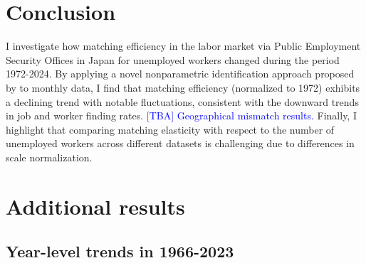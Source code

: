 \documentclass[12pt]{article}
\begin{document}
\section{Conclusion}

I investigate how matching efficiency in the labor market via Public Employment Security Offices in Japan for unemployed workers changed during the period 1972-2024. By applying a novel nonparametric identification approach proposed by \cite{lange2020beyond} to monthly data, I find that matching efficiency (normalized to 1972) exhibits a declining trend with notable fluctuations, consistent with the downward trends in job and worker finding rates. \textcolor{blue}{[TBA] Geographical mismatch results.} Finally, I highlight that comparing matching elasticity with respect to the number of unemployed workers across different datasets is challenging due to differences in scale normalization.









\newpage

\appendix
\section{Additional results}\label{sec:year_data}
\subsection{Year-level trends in 1966-2023}
\end{document}
